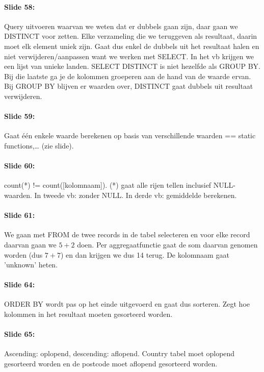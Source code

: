 \documentclass[10pt,a4paper]{report}
\begin{document}
\paragraph{Slide 58:}Query uitvoeren waarvan we weten dat er dubbels gaan zijn, daar gaan we DISTINCT voor zetten. Elke verzameling die we teruggeven als resultaat, daarin moet elk element uniek zijn. Gaat dus enkel de dubbels uit het resultaat halen en niet verwijderen/aanpassen want we werken met SELECT. In het vb krijgen we een lijst van unieke landen. SELECT DISTINCT is niet hezelfde als GROUP BY. Bij die laatste ga je de kolommen groeperen aan de hand van de waarde ervan. Bij GROUP BY blijven er waarden over, DISTINCT gaat dubbels uit resultaat verwijderen.

\paragraph{Slide 59:}Gaat \'e\'en enkele waarde berekenen op basis van verschillende waarden == static functions,… (zie slide).

\paragraph{Slide 60:}count(*) != count([kolomnaam]). (*) gaat alle rijen tellen inclusief NULL-waarden. In tweede vb: zonder NULL. In derde vb: gemiddelde berekenen.

\paragraph{Slide 61:}We gaan met FROM de twee records in de tabel selecteren en voor elke record daarvan gaan we $5+2$ doen. Per aggregaatfunctie gaat de som daarvan genomen worden (dus $7+7$) en dan krijgen we dus 14 terug. De kolomnaam gaat 'unknown' heten.

\paragraph{Slide 64:}ORDER BY wordt pas op het einde uitgevoerd en gaat dus sorteren. Zegt hoe kolommen in het resultaat moeten gesorteerd worden.

\paragraph{Slide 65:}Ascending: oplopend, descending: aflopend. Country tabel moet oplopend gesorteerd worden en de postcode moet aflopend gesorteerd worden.
\end{document}
